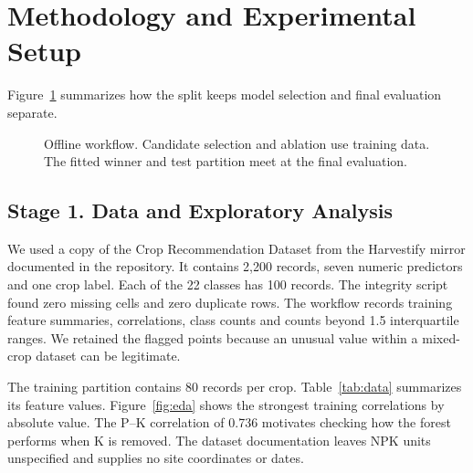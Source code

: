 \documentclass[conference]{IEEEtran}
\begin{document}
\section{Methodology and Experimental Setup}
Figure~\ref{fig:training-flow} summarizes how the split keeps model selection and final evaluation separate.

\begin{figure}[t]
\centering
{}
\caption{Offline workflow. Candidate selection and ablation use training data. The fitted winner and test partition meet at the final evaluation.}
\label{fig:training-flow}
\end{figure}

\subsection{Stage 1. Data and Exploratory Analysis}
We used a copy of the Crop Recommendation Dataset \cite{dataset} from the Harvestify mirror documented in the repository. It contains 2,200 records, seven numeric predictors and one crop label. Each of the 22 classes has 100 records. The integrity script found zero missing cells and zero duplicate rows. The workflow records training feature summaries, correlations, class counts and counts beyond 1.5 interquartile ranges. We retained the flagged points because an unusual value within a mixed-crop dataset can be legitimate.

The training partition contains 80 records per crop. Table~\ref{tab:data} summarizes its feature values. Figure~\ref{fig:eda} shows the strongest training correlations by absolute value. The P--K correlation of 0.736 motivates checking how the forest performs when K is removed. The dataset documentation leaves NPK units unspecified and supplies no site coordinates or dates.
\end{document}
